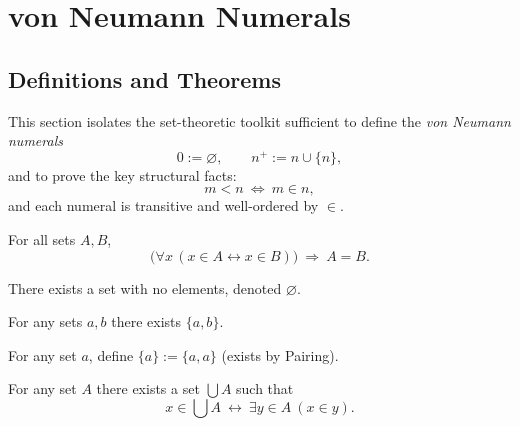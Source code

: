 
\section{von Neumann Numerals}
\label{sec:von-neumann-numerals}

\subsection*{Definitions and Theorems}

\begin{remark}[Purpose]
This section isolates the set-theoretic toolkit sufficient to define the
\emph{von Neumann numerals}
\[
0 := \varnothing,\qquad n^{+} := n\cup\{n\},
\]
and to prove the key structural facts:
\[
m<n\ \Longleftrightarrow\ m\in n,
\]
and each numeral is transitive and well-ordered by $\in$.
\end{remark}


\begin{axiom}[Extensionality]
\label{ax:vn-extensionality}
For all sets $A,B$,
\[
\bigl(\forall x\,(x\in A \leftrightarrow x\in B)\bigr)\ \Rightarrow\ A=B.
\]
\end{axiom}

\begin{axiom}
\label{ax:vn-empty-set}
There exists a set with no elements, denoted $\varnothing$.
\end{axiom}

\begin{axiom}[Pairing]
\label{ax:vn-pairing}
For any sets $a,b$ there exists $\{a,b\}$.
\end{axiom}

\begin{definition}[Singleton]
\label{def:vn-singleton}
For any set $a$, define $\{a\}:=\{a,a\}$ (exists by Pairing).
\end{definition}

\begin{axiom}[Union]
\label{ax:zf-union}
For any set $A$ there exists a set $\bigcup A$ such that
\[
x\in \bigcup A\ \leftrightarrow\ \exists y\in A\ (x\in y).
\]
\end{axiom}

